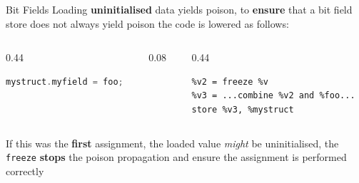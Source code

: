 \begin{frame}[fragile]{Bit Fields}
  Loading \textbf{uninitialised} data yields poison, to \textbf{ensure} that a bit field store does not always yield poison the code is lowered as follows:
 \begin{columns}[c]
   \begin{column}{0.44\textwidth}
     \begin{lstlisting}[language=C++, frame=single, xleftmargin=4pt, xrightmargin=4pt]
mystruct.myfield = foo;
     \end{lstlisting}
   \end{column}
   \begin{column}{0.08\textwidth}
     \transform
   \end{column}
   \begin{column}{0.44\textwidth}
     \begin{lstlisting}[style=llvmmono]
%v = load %mystruct
%v2 = freeze %v
%v3 = ...combine %v2 and %foo...
store %v3, %mystruct
     \end{lstlisting}
   \end{column}
 \end{columns}
 If this was the \textbf{first} assignment, the loaded value \emph{might} be uninitialised, the \texttt{freeze} \textbf{stops} the poison propagation and ensure the assignment is performed correctly
\end{frame}
